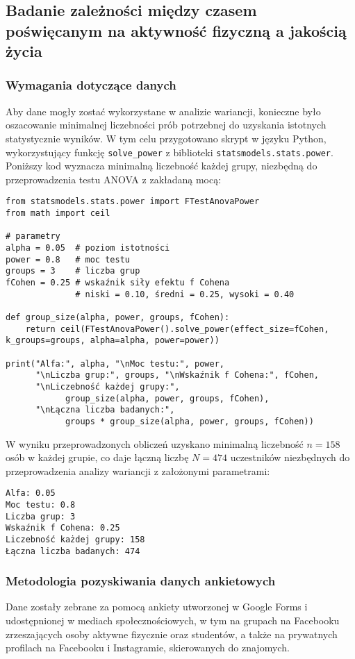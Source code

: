 \documentclass[12pt,a4paper]{article}
\begin{document}
\subsection{Badanie zależności między czasem poświęcanym na aktywność fizyczną a jakością życia}


\subsubsection{Wymagania dotyczące danych}
Aby dane mogły zostać wykorzystane w analizie wariancji, konieczne było oszacowanie minimalnej liczebności prób potrzebnej do uzyskania istotnych statystycznie wyników. W tym celu przygotowano skrypt w języku Python, wykorzystujący funkcję \texttt{solve\_power} z biblioteki \texttt{statsmodels.stats.power}. Poniższy kod wyznacza minimalną liczebność każdej grupy, niezbędną do przeprowadzenia testu ANOVA z zakładaną mocą:
\begin{lstlisting}
from statsmodels.stats.power import FTestAnovaPower
from math import ceil

# parametry
alpha = 0.05  # poziom istotności
power = 0.8   # moc testu
groups = 3    # liczba grup
fCohen = 0.25 # wskaźnik siły efektu f Cohena
              # niski = 0.10, średni = 0.25, wysoki = 0.40

def group_size(alpha, power, groups, fCohen):
    return ceil(FTestAnovaPower().solve_power(effect_size=fCohen, k_groups=groups, alpha=alpha, power=power))

print("Alfa:", alpha, "\nMoc testu:", power,
      "\nLiczba grup:", groups, "\nWskaźnik f Cohena:", fCohen,
      "\nLiczebność każdej grupy:", 
            group_size(alpha, power, groups, fCohen),
      "\nŁączna liczba badanych:", 
            groups * group_size(alpha, power, groups, fCohen))
\end{lstlisting}
W wyniku przeprowadzonych obliczeń uzyskano minimalną liczebność $n=158$ osób w każdej grupie, co daje łączną liczbę $N=474$ uczestników niezbędnych do przeprowadzenia analizy wariancji z założonymi parametrami:
\begin{lstlisting}
Alfa: 0.05 
Moc testu: 0.8 
Liczba grup: 3 
Wskaźnik f Cohena: 0.25 
Liczebność każdej grupy: 158 
Łączna liczba badanych: 474
\end{lstlisting}

\subsubsection{Metodologia pozyskiwania danych ankietowych}
Dane zostały zebrane za pomocą ankiety utworzonej w Google Forms i udostępnionej w mediach społecznościowych, w tym na grupach na Facebooku zrzeszających osoby aktywne fizycznie oraz studentów, a także na prywatnych profilach na Facebooku i Instagramie, skierowanych do znajomych.
\end{document}
